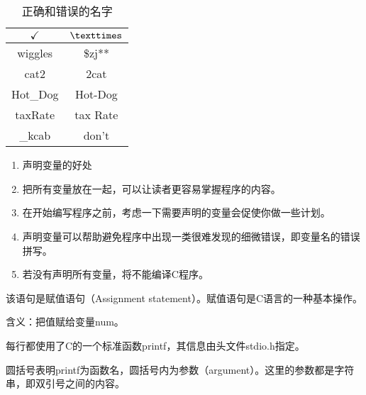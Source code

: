 \begin{frame}[fragile]

\begin{table}
\centering
\caption{正确和错误的名字}
\begin{tabular}{c|c}\hline
${\checkmark}$&${\texttimes}$\\[0.1in]\hline
wiggles &   \$zj**\\[0.1in]
cat2 &  2cat\\[0.1in]
Hot\_Dog &  Hot-Dog\\[0.1in]
taxRate &  tax Rate\\[0.1in]
\_kcab &  don't\\\hline
\end{tabular}
\end{table}


\end{frame}


\begin{frame}[fragile]
\begin{enumerate}[3]
\item 声明变量的好处\\[0.1in]
\item[] 把所有变量放在一起，可以让读者更容易掌握程序的内容。
\\[0.1in]
\item[] 在开始编写程序之前，考虑一下需要声明的变量会促使你做一些计划。\\[0.1in]
\item[] 声明变量可以帮助避免程序中出现一类很难发现的细微错误，即变量名的错误拼写。\\[0.1in]
\item[] 若没有声明所有变量，将不能编译C程序。
\end{enumerate}
\end{frame}


\begin{frame}[fragile]


 
该语句是赋值语句（Assignment statement）。赋值语句是C语言的一种基本操作。\vspace{0.1in}

含义：把值赋给变量num。
 
\end{frame}


\begin{frame}[fragile]

 

每行都使用了C的一个标准函数printf，其信息由头文件stdio.h指定。
\vspace{0.1in}

圆括号表明printf为函数名，圆括号内为参数（argument）。这里的参数都是字符串，即双引号之间的内容。
 
\end{frame}


